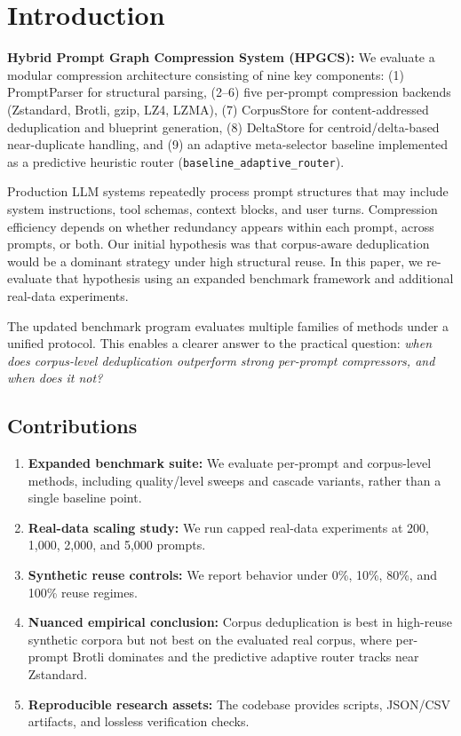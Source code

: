 \documentclass[10pt,conference]{IEEEtran}
\begin{document}
\section{Introduction}
\textbf{Hybrid Prompt Graph Compression System (HPGCS):} We evaluate a modular compression architecture consisting of nine key components: (1) PromptParser for structural parsing, (2--6) five per-prompt compression backends (Zstandard, Brotli, gzip, LZ4, LZMA), (7) CorpusStore for content-addressed deduplication and blueprint generation, (8) DeltaStore for centroid/delta-based near-duplicate handling, and (9) an adaptive meta-selector baseline implemented as a predictive heuristic router (\texttt{baseline\_adaptive\_router}).

Production LLM systems repeatedly process prompt structures that may include system instructions, tool schemas, context blocks, and user turns. Compression efficiency depends on whether redundancy appears within each prompt, across prompts, or both. Our initial hypothesis was that corpus-aware deduplication would be a dominant strategy under high structural reuse. In this paper, we re-evaluate that hypothesis using an expanded benchmark framework and additional real-data experiments.

The updated benchmark program evaluates multiple families of methods under a unified protocol. This enables a clearer answer to the practical question: \textit{when does corpus-level deduplication outperform strong per-prompt compressors, and when does it not?}

\subsection{Contributions}
\begin{enumerate}
    \item \textbf{Expanded benchmark suite:} We evaluate per-prompt and corpus-level methods, including quality/level sweeps and cascade variants, rather than a single baseline point.
    \item \textbf{Real-data scaling study:} We run capped real-data experiments at 200, 1,000, 2,000, and 5,000 prompts.
    \item \textbf{Synthetic reuse controls:} We report behavior under 0\%, 10\%, 80\%, and 100\% reuse regimes.
    \item \textbf{Nuanced empirical conclusion:} Corpus deduplication is best in high-reuse synthetic corpora but not best on the evaluated real corpus, where per-prompt Brotli dominates and the predictive adaptive router tracks near Zstandard.
    \item \textbf{Reproducible research assets:} The codebase provides scripts, JSON/CSV artifacts, and lossless verification checks.
\end{enumerate}
\end{document}

